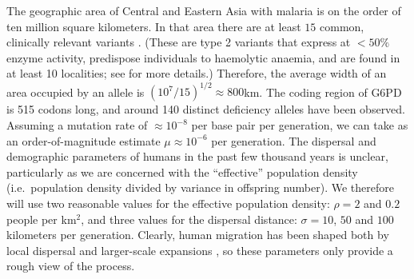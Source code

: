 \documentclass{article}
\begin{document}


The geographic area of Central and Eastern Asia with malaria is 
on the order of ten million square kilometers.
In that area there are at least $15$ common, clinically relevant variants \citep[see Figure \ref{fig-G6PD-map}, from][]{Howes-g6pd-variants}. (These are type 2 variants that express at ${}<50\%$ enzyme activity, 
predispose individuals to haemolytic anaemia, 
and are found in at least 10 localities;
see \citet{Howes-g6pd-variants} for more details.)
Therefore, the average width of an area occupied by an allele is $(10^7/15)^{1/2} \approx  800$km. 
The coding region of G6PD is 515 codons long, 
and around 140 distinct deficiency alleles have been observed. 
Assuming a mutation rate of $\approx 10^{-8}$ per base pair per generation, 
we can take as an order-of-magnitude estimate $\mu \approx 10^{-6}$ per generation. 
The dispersal and demographic parameters of humans in the past few thousand years is unclear,
particularly as we are concerned with the ``effective'' population density
(i.e.\ population density divided by variance in offspring number).
We therefore will use two reasonable values for the effective population density: $\rho=2$ and $0.2$ people per km$^2$,
and three values for the dispersal distance: $\sigma=10$, $50$ and $100$ kilometers per generation.
Clearly, human migration has been shaped both by local dispersal and larger-scale expansions 
\citep[see][for a recent discussion]{Pickrell:14}, 
so these parameters only provide a rough view of the process.



\end{document}
